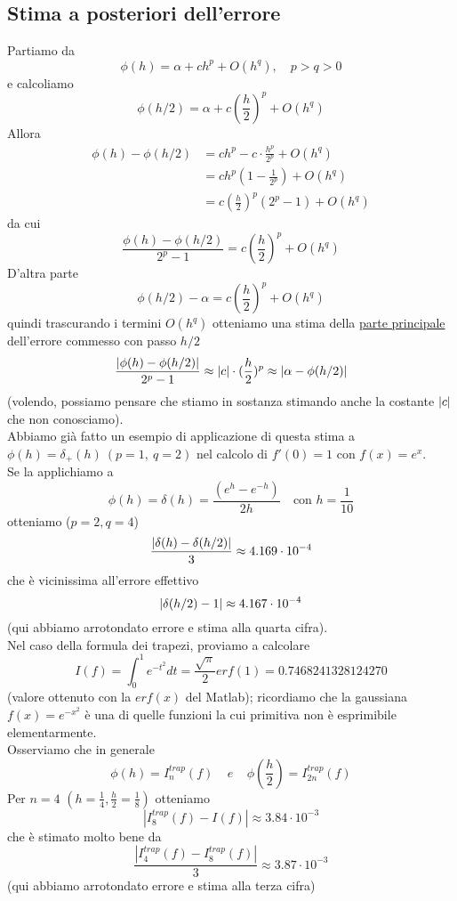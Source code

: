 \subsection{Stima a posteriori dell'errore}
Partiamo da
\[
\phi (h) = \alpha + ch^p + O(h^q), \quad p>q>0
\]
e calcoliamo
\[
\phi (h/2) = \alpha + c(\frac{h}{2})^p + O(h^q)
\]
Allora
\[
\begin{split}
\phi (h) - \phi (h/2) & = ch^p - c \cdot \frac{h^p}{2^p} + O(h^q) \\
& = ch^p (1 - \frac{1}{2^p}) + O(h^q) \\
& = c(\frac{h}{2})^p (2^p-1) + O(h^q)
\end{split}
\]
da cui
\[
\frac{\phi (h) - \phi (h/2)}{2^p - 1} = c(\frac{h}{2})^p + O(h^q)
\]
D'altra parte
\[
\phi (h/2) - \alpha = c(\frac{h}{2})^p + O(h^q)
\]
quindi trascurando i termini $O(h^q)$ otteniamo una stima della \uline{parte principale} dell'errore commesso con passo $h/2$
\[
\frac{\lvert\phi (h) - \phi (h/2)\rvert}{2^p-1} \approx \lvert c\rvert \cdot (\frac{h}{2})^p \approx \lvert\alpha - \phi (h/2)\rvert
\]
(volendo, possiamo pensare che stiamo in sostanza stimando anche la costante $\lvert c\rvert$ che non conosciamo).\\
Abbiamo già fatto un esempio
di applicazione di questa stima a $\phi (h) = \delta_+ (h) \ (p=1, \ q=2)$ nel calcolo di $f'(0) = 1$ con $f(x) = e^x$.\\
Se la applichiamo a
\[
\phi (h) = \delta (h) = \frac{(e^h - e^{-h})}{2h} \quad \text{con } h=\frac{1}{10}
\]
otteniamo ($p=2, q=4$)
\[
\frac{\lvert\delta (h) - \delta (h/2)\rvert}{3} \approx 4.169 \cdot 10^{-4}
\]
che è vicinissima all'errore effettivo
\[
\lvert\delta (h/2) - 1\rvert \approx 4.167 \cdot 10^{-4}
\]
(qui abbiamo arrotondato errore e stima alla quarta cifra).\\
Nel caso della formula dei trapezi, proviamo a calcolare 
\begin{equation*}
    I(f)=\int_0^1e^{-t^2}dt=\frac{\sqrt{\pi}}{2}erf(1)=0.7468241328124270
\end{equation*}
(valore ottenuto con la $erf(x)$ del Matlab); ricordiamo che la gaussiana $f(x)=e^{-x^2}$ è una di quelle funzioni la cui primitiva non è esprimibile elementarmente.\\Osserviamo che in generale 
\begin{equation*}
    \phi(h)=I_n^{trap}(f)\  \  \  \  \ e \  \  \  \  \ \phi(\frac{h}{2})=I_{2n}^{trap}(f)
\end{equation*}
Per $n=4$ $(h=\frac{1}{4},\frac{h}{2}=\frac{1}{8})$ otteniamo
\begin{equation*}
    |I_8^{trap}(f)-I(f)|\approx3.84\cdot 10^{-3}
\end{equation*}
che è stimato molto bene da
\begin{equation*}
    \frac{|I_4^{trap}(f)-I_8^{trap}(f)|}{3}\approx3.87\cdot 10^{-3}
\end{equation*}
(qui abbiamo arrotondato errore e stima alla terza cifra)\\\\

